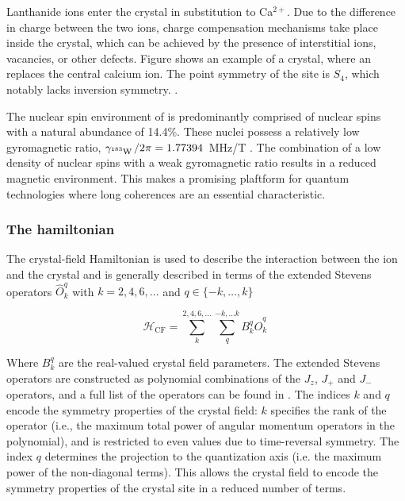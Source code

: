 Lanthanide ions enter the crystal in substitution to Ca$^{2+}$. Due to the difference in charge between the two ions, charge compensation mechanisms take place inside the crystal, which can be achieved by the presence of interstitial ions, vacancies, or other defects. Figure  shows an example of a \Ca crystal, where an \Er replaces the central calcium ion. The point symmetry of the \Er site is $S_4$, which notably lacks inversion symmetry. .

The nuclear spin environment of \Ca is predominantly comprised of \W nuclear spins with a natural abundance of 14.4\%. These nuclei possess a relatively low gyromagnetic ratio, $\gamma_{\text{$^{183}$W\,}}/2\pi = 1.77394$~MHz/T \cite{knight_solid-state_1986}. The combination of a low density of nuclear spins with a weak gyromagnetic ratio results in a reduced magnetic environment. This makes \Ca a promising plaftform for quantum technologies where long coherences are an essential characteristic.

\subsubsection{The hamiltonian}
The crystal-field Hamiltonian is used to describe the interaction between the ion and the crystal and is generally described in terms of the extended Stevens operators $\hat{O}^q_k$ with $k=2,4,6,\dots$ and $q \in \{-k,\dots, k\}$ \cite{abragam_electron_2012, stevens_matrix_1952}

\begin{equation}
    \mathcal{H}_{\mathrm{CF}} = \sum_{k}^{2,4,6,\dots}\sum_{q}^{-k,...k} B_k^q \hat{O}^q_k \,
\end{equation}

Where $B_k^q$ are the real-valued crystal field parameters. The extended Stevens operators are constructed as polynomial combinations of the $J_z$, $J_+$ and $J_-$ operators, and a full list of the operators can be found in \cite{altshuler_electron_1964}. The indices $k$ and $q$ encode the symmetry properties of the crystal field: $k$ specifies the rank of the operator (i.e., the maximum total power of angular momentum operators in the polynomial), and is restricted to even values due to time-reversal symmetry. The index $q$ determines the projection to the quantization axis (i.e. the maximum power of the non-diagonal terms). This allows the crystal field to encode the symmetry properties of the crystal site in a reduced number of terms. 

